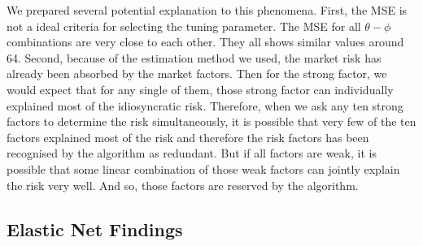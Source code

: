 We prepared several potential explanation to this phenomena.
First, the MSE is not a ideal criteria for selecting the tuning parameter.
The MSE for all $\theta - \phi$ combinations are very close to each other.
They all shows similar values around 64.
Second, because of the estimation method we used, the market risk has already been absorbed by the market factors.
Then for the strong factor, we would expect that for any single of them, those strong factor can individually explained most of the idiosyncratic risk.
Therefore, when we ask any ten strong factors to determine the risk simultaneously, it is possible that very few of the ten factors explained most of the risk and therefore the risk factors has been recognised by the algorithm as redundant.
But if all factors are weak, it is possible that some linear combination of those weak factors can jointly explain the risk very well.
And so, those factors are reserved by the algorithm. 





\subsection{Elastic Net Findings}
